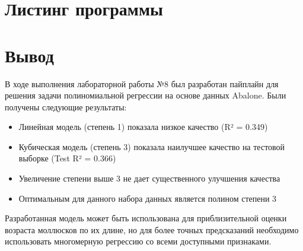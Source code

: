 \section{Листинг программы}



\section*{Вывод}

В ходе выполнения лабораторной работы №8 был разработан пайплайн для решения задачи полиномиальной регрессии на основе данных Abalone. Были получены следующие результаты:

\begin{itemize}
    \item Линейная модель (степень 1) показала низкое качество (R² = 0.349)
    \item Кубическая модель (степень 3) показала наилучшее качество на тестовой выборке (Test R² = 0.366)
    \item Увеличение степени выше 3 не дает существенного улучшения качества
    \item Оптимальным для данного набора данных является полином степени 3
\end{itemize}

Разработанная модель может быть использована для приблизительной оценки возраста моллюсков по их длине, но для более точных предсказаний необходимо использовать многомерную регрессию со всеми доступными признаками.

\endinput